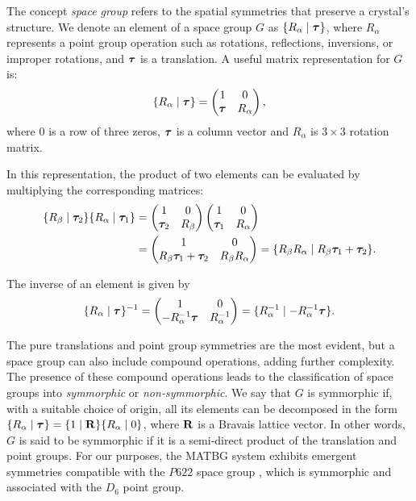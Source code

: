 \documentclass[12pt]{report}
\begin{document}
The concept \textit{space group} refers to the spatial symmetries that preserve a crystal's structure. We denote an element of a space group $G$ as $\{ R_\alpha \mid {\bm{\tau}} \}$, where $R_\alpha$ represents a point group operation such as rotations, reflections, inversions, or improper rotations, and ${\bm{\tau}}$ is a translation. A useful matrix representation for $G$ is:
\begin{equation} \label{eq:spacegroup-rep}
\{ R_\alpha \mid {\bm{\tau}} \} =
\begin{pmatrix}
1 & 0 \\
{\bm{\tau}} & R_\alpha
\end{pmatrix},
\end{equation}
where $0$ is a row of three zeros, ${\bm{\tau}}$ is a column vector and $R_\alpha$ is $3\times 3$ rotation matrix.

In this representation, the product of two elements can be evaluated by multiplying the corresponding matrices:
\begin{align}
\begin{split}
\{ R_\beta \mid {\bm{\tau}}_2 \} \{ R_\alpha \mid {\bm{\tau}}_1 \} &=
\begin{pmatrix}
1 & 0 \\
{\bm{\tau}}_2 & R_\beta
\end{pmatrix}
\begin{pmatrix}
1 & 0 \\
{\bm{\tau}}_1 & R_\alpha
\end{pmatrix} \\
&= \begin{pmatrix}
1 & 0 \\
R_\beta {\bm{\tau}}_1 + {\bm{\tau}}_2 & R_\beta R_\alpha
\end{pmatrix}
= \{ R_\beta R_\alpha \mid R_\beta {\bm{\tau}}_1 + {\bm{\tau}}_2 \}.
\end{split}
\end{align}

The inverse of an element is given by
\begin{equation} \label{eq:inv-spacegroup}
\{ R_\alpha \mid {\bm{\tau}} \}^{-1} =
\begin{pmatrix}
1 & 0 \\
-R_\alpha^{-1}{\bm{\tau}} & R_\alpha^{-1}
\end{pmatrix} =
\{ R_\alpha^{-1} \mid -R_\alpha^{-1}{\bm{\tau}} \}.
\end{equation}

The pure translations and point group symmetries are the most evident, but a space group can also include compound operations, adding further complexity. The presence of these compound operations leads to the classification of space groups into \textit{symmorphic} or \textit{non-symmorphic}. We say that $G$ is symmorphic if, with a suitable choice of origin, all its elements can be decomposed in the form $\{ R_\alpha \mid {\bm{\tau}} \} = \{ 1 \mid \vb{R} \} \{ R_\alpha \mid 0 \}$, where $\vb{R}$ is a Bravais lattice vector. In other words, $G$ is said to be symmorphic if it is a semi-direct product of the translation and point groups. For our purposes, the MATBG system exhibits emergent symmetries compatible with the $P622$ space group \cite{thesis_rennella}, which is symmorphic and associated with the $D_6$ point group.
\end{document}
